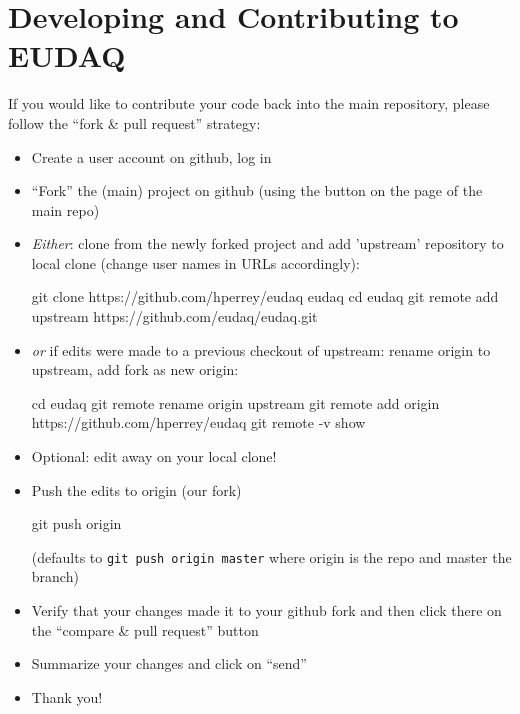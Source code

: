 \section{Developing and Contributing to EUDAQ}

If you would like to contribute your code back into the main repository, please follow the ``fork \& pull request'' strategy:

\begin{itemize}
\item Create a user account on github, log in
\item ``Fork'' the (main) project on github (using the button on the page of the main repo)
\item \emph{Either}: clone from the newly forked project and add
  'upstream' repository to local clone (change user names in URLs
  accordingly):
  \begin{listing}[mybash]
git clone https://github.com/hperrey/eudaq eudaq
cd eudaq
git remote add upstream https://github.com/eudaq/eudaq.git
\end{listing}
\item \emph{or} if edits were made to a previous checkout of upstream: rename origin to upstream, add fork as new origin:

  \begin{listing}[mybash]
cd eudaq
git remote rename origin upstream
git remote add origin https://github.com/hperrey/eudaq
git remote -v show
\end{listing}
\item Optional: edit away on your local clone!
\item Push the edits to origin (our fork)
  \begin{listing}[mybash]
git push origin
\end{listing}
(defaults to \texttt{git push origin master} where origin is the repo and master the branch)
\item Verify that your changes made it to your github fork and then click there on the ``compare \& pull request'' button
\item Summarize your changes and click on ``send''
\item Thank you!
\end{itemize}
